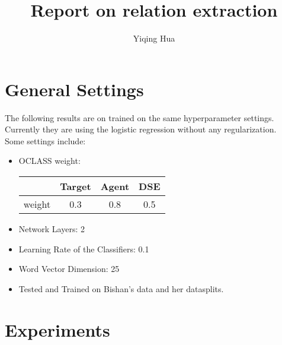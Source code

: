 \documentclass[a4paper, 12pt]{article}
\title{Report on relation extraction}
\author{Yiqing Hua}
\begin{document}
\maketitle

\section{General Settings}

The following results are on trained on the same hyperparameter
settings. Currently they are using the logistic regression without any
regularization. \\
Some settings include:\\
\begin{itemize}
  \item OCLASS weight: 
    \begin{table}[h!]
      \centering
      \begin{tabular}{c|c|c|c}
        & Target  & Agent & DSE \\
        \hline
       weight & 0.3  & 0.8 & 0.5
      \end{tabular}
    \end{table}
  \item Network Layers: 2
  \item Learning Rate of the Classifiers: 0.1
  \item Word Vector Dimension: 25
  \item Tested and Trained on Bishan's data and her datasplits.
\end{itemize}

\section{Experiments}
\end{document}
